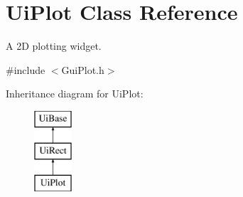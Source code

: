 \hypertarget{class_ui_plot}{\section{Ui\-Plot Class Reference}
\label{class_ui_plot}
}


A 2\-D plotting widget.  




{\ttfamily \#include $<$Gui\-Plot.\-h$>$}

Inheritance diagram for Ui\-Plot\-:\begin{figure}[H]
\begin{center}
\leavevmode
\includegraphics[height=3.000000cm]{class_ui_plot}
\end{center}
\end{figure}
